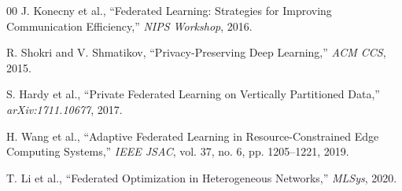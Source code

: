 \documentclass[conference]{IEEEtran}
\begin{document}
\begin{thebibliography}{00}
J. Konecny et al.,
``Federated Learning: Strategies for Improving Communication Efficiency,''
\textit{NIPS Workshop}, 2016.

R. Shokri and V. Shmatikov,
``Privacy-Preserving Deep Learning,''
\textit{ACM CCS}, 2015.

S. Hardy et al.,
``Private Federated Learning on Vertically Partitioned Data,''
\textit{arXiv:1711.10677}, 2017.

H. Wang et al.,
``Adaptive Federated Learning in Resource-Constrained Edge Computing Systems,''
\textit{IEEE JSAC}, vol. 37, no. 6, pp. 1205--1221, 2019.

T. Li et al.,
``Federated Optimization in Heterogeneous Networks,''
\textit{MLSys}, 2020.

\end{thebibliography}
\end{document}
